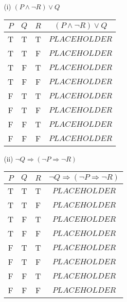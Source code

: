 \documentclass{article}
\begin{document}
(i) $(P \land \neg R) \lor Q$\\
\begin{tabular}{|c|c|c|c|}
    \hline
    $P$ & $Q$ & $R$ & $(P \land \neg R) \lor Q$ \\
    \hline
    T   & T   & T   & $PLACEHOLDER$             \\
    T   & T   & F   & $PLACEHOLDER$             \\
    T   & F   & T   & $PLACEHOLDER$             \\
    T   & F   & F   & $PLACEHOLDER$             \\
    F   & T   & T   & $PLACEHOLDER$             \\
    F   & T   & F   & $PLACEHOLDER$             \\
    F   & F   & T   & $PLACEHOLDER$             \\
    F   & F   & F   & $PLACEHOLDER$             \\
    \hline
\end{tabular}

(ii) $\neg Q \Rightarrow (\neg P \Rightarrow \neg R)$\\
\begin{tabular}{|c|c|c|c|}
    \hline
    $P$ & $Q$ & $R$ & $\neg Q \Rightarrow (\neg P \Rightarrow \neg R)$ \\
    \hline
    T   & T   & T   & $PLACEHOLDER$                                    \\
    T   & T   & F   & $PLACEHOLDER$                                    \\
    T   & F   & T   & $PLACEHOLDER$                                    \\
    T   & F   & F   & $PLACEHOLDER$                                    \\
    F   & T   & T   & $PLACEHOLDER$                                    \\
    F   & T   & F   & $PLACEHOLDER$                                    \\
    F   & F   & T   & $PLACEHOLDER$                                    \\
    F   & F   & F   & $PLACEHOLDER$                                    \\
    \hline
\end{tabular}
\end{document}
